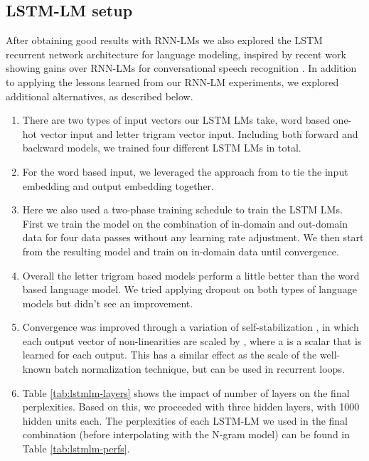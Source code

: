 \documentclass{article}
\begin{document}
\subsection{LSTM-LM setup}
After obtaining good results with RNN-LMs we also explored the LSTM recurrent network architecture for
language modeling, inspired by recent work showing gains over RNN-LMs for conversational speech recognition
\cite{medennikov2016improving}.
In addition to applying the lessons learned from our RNN-LM experiments, we explored additional alternatives,
as described below.
\begin{enumerate}
\item
	There are two types of input vectors our LSTM LMs take, word based one-hot vector input and letter trigram vector \cite{huang2013learning} input.
	Including both forward and backward models, we trained four different LSTM LMs in total. 
\item
	For the word based input, we leveraged the approach from \cite{press2016using} to tie the input embedding and output embedding together. 
\item
	Here we also used a two-phase training schedule to train the LSTM LMs. First we train the model on the combination of in-domain 
	and out-domain data for four data passes without any learning rate adjustment. We then start from the resulting model 
	and train on in-domain data until convergence. 
\item
	Overall the letter trigram based models perform a little better than the word based language model. We tried applying dropout on both types of language
	models but didn't see an improvement.
\item
	Convergence was improved through a variation of self-stabilization \cite{ghahremani2016stab}, in which each output vector  of non-linearities are scaled by
	, where a  is a scalar that is learned for each output.
	This has a similar effect as the scale of the well-known batch normalization technique, but can be used in recurrent loops.
\item
	Table \ref{tab:lstmlm-layers} shows the impact of number of layers on the final perplexities.
	Based on this, we proceeded with three hidden layers, with 1000 hidden units each.
	The perplexities of each LSTM-LM we used in the final combination (before interpolating with the N-gram model)
	can be found in Table \ref{tab:lstmlm-perfs}.
\end{enumerate}
\end{document}
